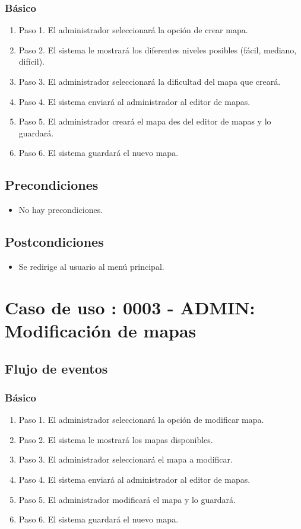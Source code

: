 \subsubsection{Básico}

\begin{enumerate}
\item Paso 1.
El administrador seleccionará la opción de crear mapa.
\item Paso 2.
El sistema le mostrará los diferentes niveles posibles (fácil, mediano, difícil).
\item Paso 3.
El administrador seleccionará la dificultad del mapa que creará.
\item Paso 4.
El sistema enviará al administrador al editor de mapas.
\item Paso 5.
El administrador creará el mapa des del editor de mapas y lo guardará.
\item Paso 6.
El sistema guardará el nuevo mapa.
\end{enumerate}

\subsection{Precondiciones}
\begin{itemize}
\item No hay precondiciones.
\end{itemize}

\subsection{Postcondiciones}
\begin{itemize}
\item Se redirige al usuario al menú principal.
\end{itemize}



\section{Caso de uso : 0003 - ADMIN: Modificación de mapas}\label{sec:uc0}
\subsection{Flujo de eventos}
\subsubsection{Básico}

\begin{enumerate}
\item Paso 1.
El administrador seleccionará la opción de modificar mapa.
\item Paso 2.
El sistema le mostrará los mapas disponibles.
\item Paso 3.
El administrador seleccionará el mapa a modificar.
\item Paso 4.
El sistema enviará al administrador al editor de mapas.
\item Paso 5.
El administrador modificará el mapa y lo guardará.
\item Paso 6.
El sistema guardará el nuevo mapa.
\end{enumerate}

